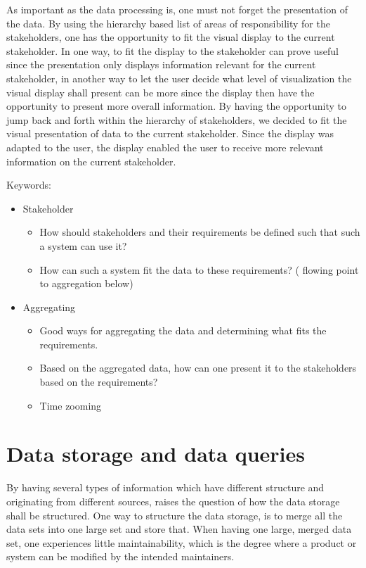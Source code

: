 As important as the data processing is, one must not forget the presentation of
the data. By using the hierarchy based list of areas of responsibility for the
stakeholders, one has the opportunity to fit the visual display to the current
stakeholder. In one way, to fit the display to the stakeholder can prove 
useful since the presentation only displays information relevant for the 
current stakeholder, in another way to let the user decide what level of 
visualization the visual display shall present can be more since the display 
then have the opportunity to present more overall information. By having the 
opportunity to jump
back and forth within the hierarchy of stakeholders, we decided to fit the 
visual presentation of data to the current stakeholder. Since the display was 
adapted to the user, the display enabled the user to receive more relevant 
information on the current stakeholder.

Keywords:
\begin{itemize}
	\item Stakeholder
	\begin{itemize}
		\item How should stakeholders and their requirements be defined such 
		that such a system can use it?
		\item How can such a system fit the data to these requirements? (
		flowing point to aggregation below)
	\end{itemize}
	\item Aggregating
	\begin{itemize}
		\item Good ways for aggregating the data and determining what fits the
		requirements.
		\item Based on the aggregated data, how can one present it to the
		stakeholders based on the requirements?
		\item Time zooming
	\end{itemize}
\end{itemize}



\section{Data storage and data queries} %
\label{sec:discussion_data_storage_and_data_queries}
By having several types of information which have different structure and
originating from different sources, raises the question of how the data storage
shall be structured. One way to structure the data storage, is to merge all the
data sets into one large set and store that. When having one large, merged 
data set, one experiences little maintainability, which is the degree where a
product or system can be modified by the intended maintainers\cite[p. 195]{Bass:2012:SAP:2392670}.

